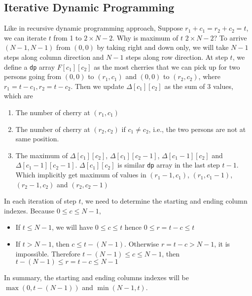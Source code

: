 \documentclass[a4paper,12pt]{article}
\begin{document}
\subsection{Iterative Dynamic Programming}
Like in recursive dynamic programming approach, Suppose $r_1+c_1=r_2+c_2=t$, we can iterate $t$ from 1 to $2\times N-2$. Why is maximum of $t$ $2\times N-2$? To arrive $(N-1,N-1)$ from $(0,0)$ by taking right and down only, we will take $N-1$ steps along column direction and $N-1$ steps along row direction. At step $t$, we define a \texttt{dp} array $F[c_1][c_2]$ as the most cherries that we can pick up for two persons going from $(0, 0)$ to $(r_1, c_1)$ and $(0, 0)$ to $(r_2, c_2)$, where $r_1 = t-c_1, r_2 = t-c_2$. Then we update $\Delta[c_1][c_2]$ as the sum of 3 values, which are 
\begin{enumerate}
\item The number of cherry at $(r_1, c_1)$
\item The number of cherry at $(r_2, c_2)$ if $c_1\neq c_2$, i.e., the two persons are not at same position.
\item The maximum of $\Delta[c_1][c_2]$, $\Delta[c_1][c_2-1]$, $\Delta[c_1-1][c_2]$ and $\Delta[c_1-1][c_2-1]$. $\Delta[c_1][c_2]$ is similar \texttt{dp} array in the last step $t-1$. Which implicitly get maximum of values in $(r_1-1, c_1)$, $(r_1, c_1-1)$, $(r_2-1, c_2)$ and $(r_2, c_2-1)$
\end{enumerate}
In each iteration of step $t$, we need to determine the starting and ending column indexes. Because $0\leq c\leq N-1$,
\begin{itemize}
\item If $t\leq N-1$, we will have $0\leq c \leq t$ hence $0\leq r=t-c\leq t$
\item If $t> N-1$, then $c \leq t-(N-1)$. Otherwise $r=t-c >N-1$, it is impossible. Therefore $t-(N-1) \leq c \leq N-1$, then $t-(N-1) \leq r=t-c\leq N-1$
\end{itemize}
In summary, the starting and ending columns indexes will be $\max(0, t-(N-1))$ and $\min(N-1, t)$.
\end{document}
